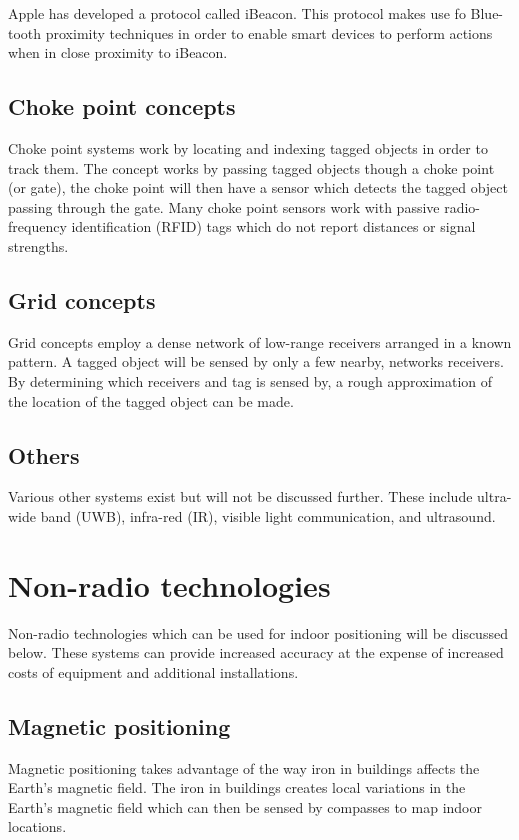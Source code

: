 \documentclass[11pt,a4paper]{report}
\begin{document}
		Apple has developed a protocol called iBeacon. This protocol makes use fo Blue-tooth proximity techniques in order to enable smart devices to perform actions when in close proximity to iBeacon.
		\cite{_everything_????}
	
	\subsection{Choke point concepts}
		Choke point systems work by locating and indexing tagged objects in order to track them. The concept works by passing tagged objects though a choke point (or gate), the choke point will then have a sensor which detects the tagged object passing through the gate. Many choke point sensors work with passive radio-frequency identification (RFID) tags which do not report distances or signal strengths.
		\cite{reza_investigation_2008}
	
	\subsection{Grid concepts}
		Grid concepts employ a dense network of low-range receivers arranged in a known pattern. A tagged object will be sensed by only a few nearby, networks receivers. By determining which receivers and tag is sensed by, a rough approximation of the location of the tagged object can be made.
	
	\subsection{Others}
		Various other systems exist but will not be discussed further. These include ultra-wide band (UWB), infra-red (IR), visible light communication, and ultrasound.
	
	\section{Non-radio technologies}
		Non-radio technologies which can be used for indoor positioning will be discussed below. These systems can provide increased accuracy at the expense of increased costs of equipment and additional installations.
	
	\subsection{Magnetic positioning}
		Magnetic positioning takes advantage of the way iron in buildings affects the Earth's magnetic field. The iron in buildings creates local variations in the Earth's magnetic field which can then be sensed by compasses to map indoor locations.
		\cite{supreeth_sudhakaran_geospatial_2014}
	
\end{document}
